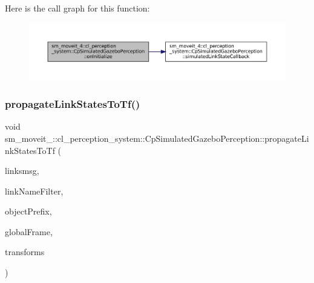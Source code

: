 Here is the call graph for this function\+:
\nopagebreak
\begin{figure}[H]
\begin{center}
\leavevmode
\includegraphics[width=350pt]{classsm__moveit__4_1_1cl__perception__system_1_1CpSimulatedGazeboPerception_adebc30f6b1fc905f783de3f7bdf4a711_cgraph}
\end{center}
\end{figure}
\mbox{\label{classsm__moveit__4_1_1cl__perception__system_1_1CpSimulatedGazeboPerception_a643fa78620216085ca385b74832a0abc}} 
\subsubsection{\texorpdfstring{propagate\+Link\+States\+To\+Tf()}{propagateLinkStatesToTf()}}
{\footnotesize\ttfamily void sm\+\_\+moveit\+\_\+::cl\+\_\+perception\+\_\+system\+::\+Cp\+Simulated\+Gazebo\+Perception\+::propagate\+Link\+States\+To\+Tf (\begin{DoxyParamCaption}\item[{const gazebo\+\_\+msgs\+::\+Link\+States \&}]{linksmsg,  }\item[{std\+::string}]{link\+Name\+Filter,  }\item[{std\+::string}]{object\+Prefix,  }\item[{std\+::string}]{global\+Frame,  }\item[{std\+::vector$<$ tf\+::\+Stamped\+Transform $>$ \&}]{transforms }\end{DoxyParamCaption})\hspace{0.3cm}{\ttfamily [inline]}}



